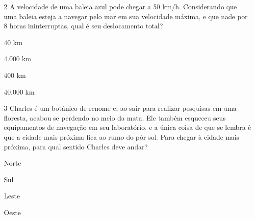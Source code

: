 \num{2} A velocidade de uma baleia azul pode chegar a 50 km/h. Considerando
que uma baleia esteja a navegar pelo mar em sua velocidade máxima, e que
nade por 8 horas ininterruptas, qual é seu deslocamento total?
\item 40 km
\item 4.000 km
\item 400 km
\item 40.000 km









\num{3} Charles é um botânico de renome e, ao sair para realizar pesquisas em
uma floresta, acabou se perdendo no meio da mata. Ele também esqueceu
seus equipamentos de navegação em seu laboratório, e a única coisa de
que se lembra é que a cidade mais próxima fica ao rumo do pôr sol. Para
chegar à cidade mais próxima, para qual sentido Charles deve andar?
\item Norte
\item Sul
\item Leste
\item Oeste





